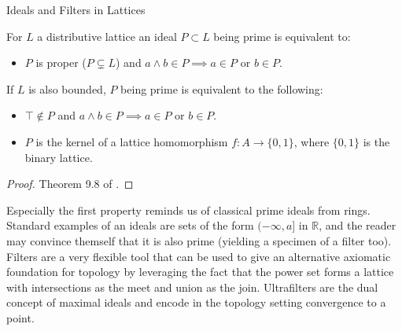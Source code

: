 \begin{subsection}{Ideals and Filters in Lattices}
    \begin{proposition} \label{propositionprime}
        For \( L \) a distributive lattice an ideal \( P \subset L \) being prime is equivalent to:
        \begin{itemize}
            \item  \( P \) is proper (\( P \subsetneq L \)) and \( a \wedge b \in P \implies a \in P \text{ or } b \in P \).
        \end{itemize}
        If \( L \) is also bounded, \( P \) being prime is equivalent to the following: 
        \begin{itemize} 
            \item \( \top \notin P \) and \( a \wedge b \in P \implies a \in P \text{ or } b \in P\).
            \item \( P \) is the kernel of a lattice homomorphism \( f : A \to \{0, 1\} \), where \( \{0, 1\} \) is the binary lattice.
        \end{itemize}
    \end{proposition}
    \begin{proof}
        Theorem 9.8 of \cite{birkhoff1948lattice}.
    \end{proof}
     Especially the first property reminds us of classical prime ideals from rings. 
        Standard examples of an ideals are sets of the form \( (-\infty, a] \) in \( \mathbb{R} \), and the reader may convince themself that it is also prime (yielding a specimen of a filter too). 
        Filters are a very flexible tool that can be used to give an alternative axiomatic foundation for topology by leveraging the fact that the power set forms a lattice with intersections as the meet and union as the join.
        Ultrafilters are the dual concept of maximal ideals and encode in the topology setting convergence to a point.


\end{subsection}
